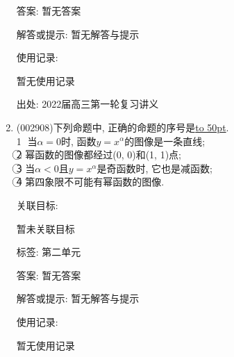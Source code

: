 \documentclass[10pt,a4paper]{article}
\newcommand{\blank}[1]{\underline{\hbox to #1pt{}}}
\begin{document}
\begin{enumerate}[1.]
答案: 暂无答案

解答或提示: 暂无解答与提示

使用记录:

暂无使用记录


出处: 2022届高三第一轮复习讲义
\item { (002908)}下列命题中, 正确的命题的序号是\blank{50}.\\
\textcircled{1} 当$\alpha =0$时, 函数$y={x^{\alpha }}$的图像是一条直线;\\
\textcircled{2} 幂函数的图像都经过(0, 0)和(1, 1)点;\\
\textcircled{3} 当$\alpha <0$且$y={x^{\alpha }}$是奇函数时, 它也是减函数;\\
\textcircled{4} 第四象限不可能有幂函数的图像.


关联目标:

暂未关联目标



标签: 第二单元

答案: 暂无答案

解答或提示: 暂无解答与提示

使用记录:

暂无使用记录



\end{enumerate}
\end{document}
